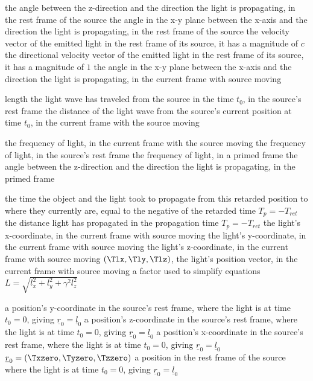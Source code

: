 {the angle between the z-direction and the direction the light is propagating, in the rest frame of the source}
{the angle in the x-y plane between the x-axis and the direction the light is propagating, in the rest frame of the source}
{the velocity vector of the emitted light in the rest frame of its source, it has a magnitude of $c$}
{the directional velocity vector of the emitted light in the rest frame of its source, it has a magnitude of $1$}
\variableterm{\Tvarphi}{\varphi}
{the angle in the x-y plane between the x-axis and the direction the light is propagating, in the current frame with source moving}

{length the light wave has traveled from the source in the time $t_0$, in the source's rest frame}
\variableterm{\Tlambda}{\lambda}
{the distance of the light wave from the source's current position at time $t_0$, in the current frame with the source moving}

\variableterm{\Tnu}{\nu}
{the frequency of light, in the current frame with the source moving}
{the frequency of light, in the source's rest frame}
{the frequency of light, in a primed frame}
{the angle between the z-direction and the direction the light is propagating, in the primed frame}

{the time the object and the light took to propagate from this retarded position to where they currently are, equal to the negative of the retarded time $T_p=-T_{ret}$}
{the distance light has propagated in the propagation time $T_p=-T_{ret}$}
{the light's x-coordinate, in the current frame with source moving}
{the light's y-coordinate, in the current frame with source moving}
{the light's z-coordinate, in the current frame with source moving}
{$(\Tlx,\Tly,\Tlz)$, the light's position vector, in the current frame with source moving}
{a factor used to simplify equations $ L =\sqrt{l_x ^2+l_y ^2+\gamma ^2 l_z ^2}$}


{a position's y-coordinate in the source's rest frame, where the light is at time $t_0=0$, giving $\underline{r}_0= \underline{l}_0$}
{a position's z-coordinate in the source's rest frame, where the light is at time $t_0=0$, giving $\underline{r}_0= \underline{l}_0$}
{a position's x-coordinate in the source's rest frame, where the light is at time $t_0=0$, giving $\underline{r}_0= \underline{l}_0$}
{$\underline{r}_0=(\Txzero,\Tyzero,\Tzzero)$ a position in the rest frame of the source where the light is at time $t_0=0$, giving $\underline{r}_0= \underline{l}_0$}


